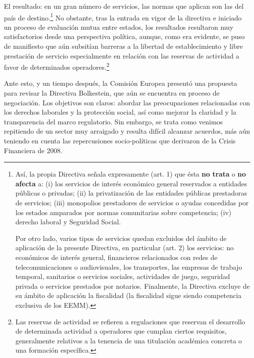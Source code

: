 \documentclass[10pt,a4paper]{article}
\begin{document}
El resultado: en un gran número de servicios, las normas que aplican son las del país de destino.\footnote{%
    Así, la propia Directiva señala expresamente (art. 1) que ésta \textbf{no trata} o \textbf{no afecta} a: (i) los servicios de interés económico general reservados a entidades públicas o privadas; (ii) la privatización de las entidades públicas prestadoras de servicios; (iii) monopolios prestadores de servicios o ayudas concedidas por los estados amparados por normas comunitarias sobre competencia; (iv) derecho laboral y Seguridad Social. 

Por otro lado, varios tipos de servicios quedan excluidos del ámbito de aplicación de la presente Directiva, en particular (art. 2) los servicios: no económicos de interés general, financieros relacionados con redes de telecomunicaciones o audiovisuales, los transportes, las empresas de trabajo temporal, sanitarios o servicios sociales, actividades de juego, seguridad privada o servicios prestados por notarios. Finalmente, la Directiva excluye de su ámbito de aplicación la fiscalidad (la fiscalidad sigue siendo competencia exclusiva de los EEMM).
} No obstante, tras la entrada en vigor de la directiva e iniciado un proceso de evaluación mutua entre estados, los resultados resultaron muy satisfactorios desde una perspectiva política, aunque, como era evidente, se puso de manifiesto que aún subsitían barreras a la libertad de establecimiento y libre prestación de servicio especialmente en relación con las reservas de actividad a favor de determinados operadores.\footnote{%
    Las reservas de actividad se refieren a regulaciones que reservan el desarrollo de determinada actividad a operadores que cumplan ciertos requisitos, generalmente relativos a la tenencia de una titulación académica concreta o una formación específica.
}

Ante esto, y un tiempo después, la Comisión Europea presentó una propuesta para revisar la Directiva Bolkestein, que aún se encuentra en proceso de negociación. Los objetivos son claros: abordar las preocupaciones relacionadas con los derechos laborales y la protección social, así como mejorar la claridad y la transparencia del marco regulatorio. Sin embargo, se trata como venimos repitiendo de un sector muy arraigado y resulta difícil alcanzar acuerdos, más aún teniendo en cuenta las repercusiones socio-políticas que derivaron de la Crisis Financiera de 2008.
\end{document}
